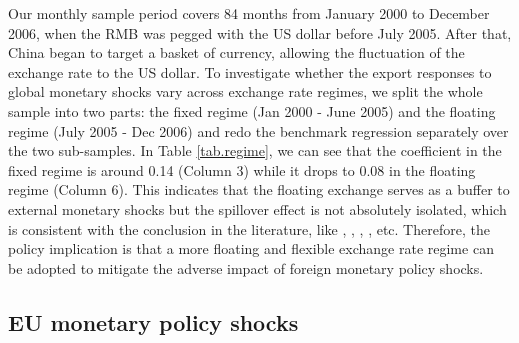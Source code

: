 Our monthly sample period covers 84 months from January 2000 to December 2006, when the RMB was pegged with the US dollar before July 2005. After that, China began to target a basket of currency, allowing the fluctuation of the exchange rate to the US dollar. To investigate whether the export responses to global monetary shocks vary across exchange rate regimes, we split the whole sample into two parts: the fixed regime (Jan 2000 - June 2005) and the floating regime (July 2005 - Dec 2006) and redo the benchmark regression separately over the two sub-samples. In Table \ref{tab.regime}, we can see that the coefficient in the fixed regime is around 0.14 (Column 3) while it drops to 0.08 in the floating regime (Column 6). This indicates that the floating exchange serves as a buffer to external monetary shocks but the spillover effect is not absolutely isolated, which is consistent with the conclusion in the literature, like \cite{shambaugh2004effect}, \cite{klein2012exchange}, \cite{georgiadis2016determinants}, \cite{dedola2017if}, etc. Therefore, the policy implication is that a more floating and flexible exchange rate regime can be adopted to mitigate the adverse impact of foreign monetary policy shocks.







\subsection{EU monetary policy shocks}

